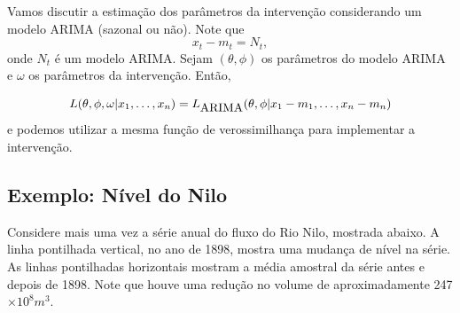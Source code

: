 \documentclass[
  letterpaper,
  DIV=11,
  numbers=noendperiod]{scrartcl}
\theoremstyle{plain}
\theoremstyle{plain}
\theoremstyle{definition}
\theoremstyle{definition}
\theoremstyle{remark}
\begin{document}
\begin{figure}

\begin{minipage}[t]{\linewidth}

{\centering 


}

\end{minipage}%

\end{figure}

Vamos discutir a estimação dos parâmetros da intervenção considerando um
modelo ARIMA (sazonal ou não). Note que \[x_t-m_t=N_t,\] onde \(N_t\) é
um modelo ARIMA. Sejam \((\theta,\phi)\) os parâmetros do modelo ARIMA e
\(\omega\) os parâmetros da intervenção. Então,

\[L(\theta,\phi,\omega|x_1,\ldots,x_n)=L_{\hbox{ARIMA}}(\theta,\phi|x_1-m_1,\ldots,x_n-m_n)\]
e podemos utilizar a mesma função de verossimilhança para implementar a
intervenção.

\hypertarget{exemplo-nuxedvel-do-nilo}{%
\subsection{Exemplo: Nível do Nilo}\label{exemplo-nuxedvel-do-nilo}}

Considere mais uma vez a série anual do fluxo do Rio Nilo, mostrada
abaixo. A linha pontilhada vertical, no ano de 1898, mostra uma mudança
de nível na série. As linhas pontilhadas horizontais mostram a média
amostral da série antes e depois de 1898. Note que houve uma redução no
volume de aproximadamente 247 \(\times 10^8 m^3\).
\end{document}
